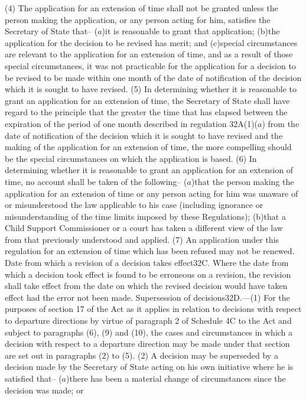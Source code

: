\documentclass[12pt,a4paper]{article}
\begin{document}
(4) The application for an extension of time shall not be granted unless the person making the application, or any person acting for him, satisfies the Secretary of State that–
($a$)it is reasonable to grant that application;
(b)the application for the decision to be revised has merit; and
(c)special circumstances are relevant to the application for an extension of time,
and as a result of those special circumstances, it was not practicable for the application for a decision to be revised to be made within one month of the date of notification of the decision which it is sought to have revised.
(5) In determining whether it is reasonable to grant an application for an extension of time, the Secretary of State shall have regard to the principle that the greater the time that has elapsed between the expiration of the period of one month described in regulation 32A(1)($a$) from the date of notification of the decision which it is sought to have revised and the making of the application for an extension of time, the more compelling should be the special circumstances on which the application is based.
(6) In determining whether it is reasonable to grant an application for an extension of time, no account shall be taken of the following–
($a$)that the person making the application for an extension of time or any person acting for him was unaware of or misunderstood the law applicable to his case (including ignorance or misunderstanding of the time limits imposed by these Regulations);
(b)that a Child Support Commissioner or a court has taken a different view of the law from that previously understood and applied.
(7) An application under this regulation for an extension of time which has been refused may not be renewed.
Date from which a revision of a decision takes effect32C.  Where the date from which a decision took effect is found to be erroneous on a revision, the revision shall take effect from the date on which the revised decision would have taken effect had the error not been made.
Supersession of decisions32D.—(1) For the purposes of section 17 of the Act as it applies in relation to decisions with respect to departure directions by virtue of paragraph 2 of Schedule 4C to the Act and subject to paragraphs (6), (9) and (10), the cases and circumstances in which a decision with respect to a departure direction may be made under that section are set out in paragraphs (2) to (5).
(2) A decision may be superseded by a decision made by the Secretary of State acting on his own initiative where he is satisfied that–
($a$)there has been a material change of circumstances since the decision was made; or
\end{document}
